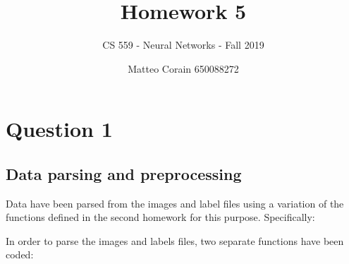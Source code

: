 \documentclass[letterpaper,headings=standardclasses]{scrartcl}
\title{Homework 5}
\subtitle{CS 559 - Neural Networks - Fall 2019}
\author{Matteo Corain 650088272}
\begin{document}
\maketitle

\section{Question 1}

\subsection{Data parsing and preprocessing}

Data have been parsed from the images and label files using a variation of the functions defined in the second homework for this purpose. Specifically:

In order to parse the images and labels files, two separate functions have been coded:
\end{document}
